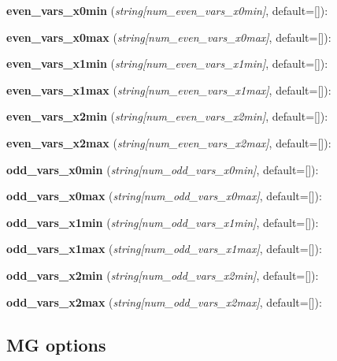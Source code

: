 \documentclass[aps,amssymb,unsortedaddress,nofootinbib]{revtex4}
\def\lsep{\itemsep 0.05in}
\begin{document}
\begin{list}{}{\lsep}
\item {\bf even\_vars\_x0min} ({\em string[num\_even\_vars\_x0min]}, default=[]):
\item {\bf even\_vars\_x0max} ({\em string[num\_even\_vars\_x0max]}, default=[]):
\item {\bf even\_vars\_x1min} ({\em string[num\_even\_vars\_x1min]}, default=[]):
\item {\bf even\_vars\_x1max} ({\em string[num\_even\_vars\_x1max]}, default=[]):
\item {\bf even\_vars\_x2min} ({\em string[num\_even\_vars\_x2min]}, default=[]):
\item {\bf even\_vars\_x2max} ({\em string[num\_even\_vars\_x2max]}, default=[]):
\item {\bf odd\_vars\_x0min} ({\em string[num\_odd\_vars\_x0min]}, default=[]):
\item {\bf odd\_vars\_x0max} ({\em string[num\_odd\_vars\_x0max]}, default=[]):
\item {\bf odd\_vars\_x1min} ({\em string[num\_odd\_vars\_x1min]}, default=[]):
\item {\bf odd\_vars\_x1max} ({\em string[num\_odd\_vars\_x1max]}, default=[]):
\item {\bf odd\_vars\_x2min} ({\em string[num\_odd\_vars\_x2min]}, default=[]):
\item {\bf odd\_vars\_x2max} ({\em string[num\_odd\_vars\_x2max]}, default=[]):
\end{list}


\subsection{MG options}
\end{document}
